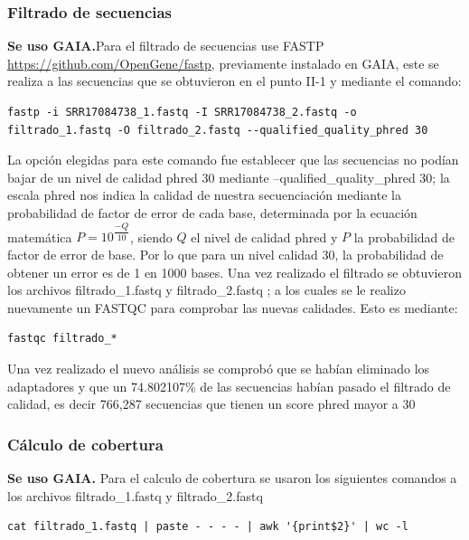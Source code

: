 \documentclass[journal, letterpaper, 11pt]{IEEEtran}
\begin{document}
\subsubsection{Filtrado de secuencias}
\textbf{Se uso GAIA.}Para el filtrado de secuencias use FASTP \url{https://github.com/OpenGene/fastp}, previamente instalado en GAIA, este se realiza a las secuencias que se obtuvieron en el punto II-1 y mediante el comando:

\lstset{breaklines=true, basicstyle=\footnotesize}
\begin{lstlisting}[frame=single]
fastp -i SRR17084738_1.fastq -I SRR17084738_2.fastq -o filtrado_1.fastq -O filtrado_2.fastq --qualified_quality_phred 30
\end{lstlisting}

La opción elegidas para este comando fue establecer que las secuencias no podían bajar de un nivel de calidad phred 30 mediante --qualified\_quality\_phred 30; la escala phred nos indica la calidad de nuestra secuenciación  mediante la probabilidad de factor de error de cada base, determinada por la ecuación matemática $P=10^{\dfrac{-Q}{10}}$, siendo $Q $ el nivel de calidad phred y $P$ la probabilidad de factor de error de base. Por lo que para un nivel calidad 30, la probabilidad de obtener un error es de 1 en 1000 bases. \linebreak Una vez realizado el filtrado se obtuvieron los archivos filtrado\_1.fastq y filtrado\_2.fastq ; a los cuales se le realizo nuevamente un FASTQC para comprobar las nuevas calidades. Esto es mediante:

\lstset{breaklines=true, basicstyle=\footnotesize}
\begin{lstlisting}[frame=single]
fastqc filtrado_*
\end{lstlisting}

Una vez realizado el nuevo análisis se comprobó que se habían eliminado los adaptadores y que un 74.802107\% de las secuencias habían pasado el filtrado de calidad, es decir 766,287 secuencias que tienen un score phred mayor a 30 \linebreak
\subsubsection{Cálculo de cobertura}
\textbf{Se uso GAIA.}
Para el calculo de cobertura se usaron los siguientes comandos a los archivos filtrado\_1.fastq y filtrado\_2.fastq 

\lstset{breaklines=true, basicstyle=\footnotesize}
\begin{lstlisting}[frame=single]
cat filtrado_1.fastq | paste - - - - | awk '{print$2}' | wc -l
\end{lstlisting}
\end{document}
